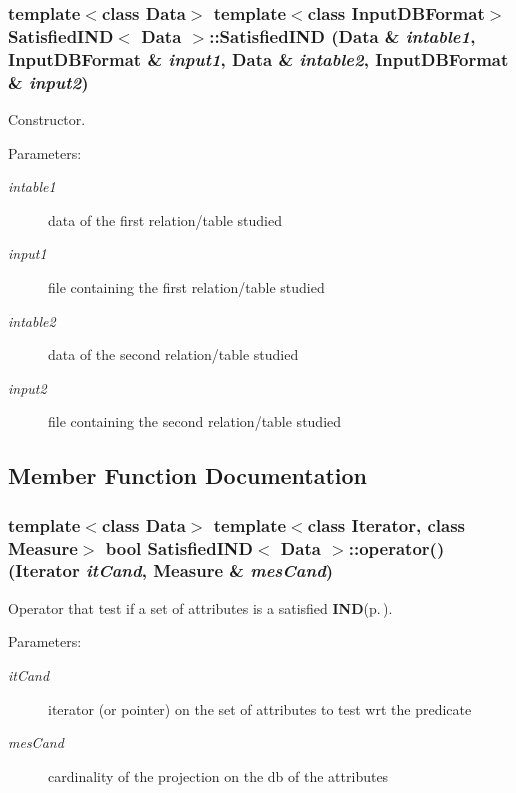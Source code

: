 \subsubsection{\setlength{\rightskip}{0pt plus 5cm}template$<$class Data$>$ template$<$class Input\-DBFormat$>$ {\bf Satisfied\-IND}$<$ Data $>$::{\bf Satisfied\-IND} (Data \& {\em intable1}, Input\-DBFormat \& {\em input1}, Data \& {\em intable2}, Input\-DBFormat \& {\em input2})\hspace{0.3cm}{\tt  [inline]}}\label{class_satisfied_i_n_d_083227d8e372ee6954f7e11e5c84d4bc}


Constructor. 

\begin{Desc}
\item[Parameters:]
\begin{description}
\item[{\em intable1}]data of the first relation/table studied \item[{\em input1}]file containing the first relation/table studied \item[{\em intable2}]data of the second relation/table studied \item[{\em input2}]file containing the second relation/table studied \end{description}
\end{Desc}


\subsection{Member Function Documentation}
\subsubsection{\setlength{\rightskip}{0pt plus 5cm}template$<$class Data$>$ template$<$class Iterator, class Measure$>$ bool {\bf Satisfied\-IND}$<$ Data $>$::operator() (Iterator {\em it\-Cand}, Measure \& {\em mes\-Cand})}\label{class_satisfied_i_n_d_bbf69fd5dfbf71f8e7f0685b80551c6d}


Operator that test if a set of attributes is a satisfied {\bf IND}{\rm (p.\,\pageref{class_i_n_d})}. 

\begin{Desc}
\item[Parameters:]
\begin{description}
\item[{\em it\-Cand}]iterator (or pointer) on the set of attributes to test wrt the predicate \item[{\em mes\-Cand}]cardinality of the projection on the db of the attributes \end{description}
\end{Desc}


